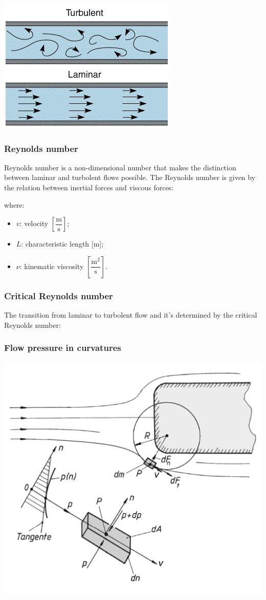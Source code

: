 \documentclass{article}
\begin{document}
\begin{center}
    \includegraphics[width=.4\textwidth]{media/laminar_turbulent_orig.png}
\end{center}

\subsubsection{Reynolds number}
Reynolds number is a non-dimensional number that makes the distinction between
laminar and turbolent flows possible. The Reynolds number is given by the
relation between inertial forces and viscous forces:


where:
\begin{itemize}
    \item $v$: velocity $\left[\dfrac{\text{m}}{\text{s}}\right]$;
    \item $L$: characteristic length [m];
    \item $\nu$: kinematic viscosity $\left[\dfrac{\text{m}^2}{\text{s}}\right]$.
\end{itemize}

\subsubsection{Critical Reynolds number}
The transition from laminar to turbolent flow and it's determined by
the critical Reynolds number:

\subsubsection{Flow pressure in curvatures}
\begin{center}
    \includegraphics[width=.6\textwidth]{media/Kruemmungsdruck.png}
\end{center}
\end{document}
